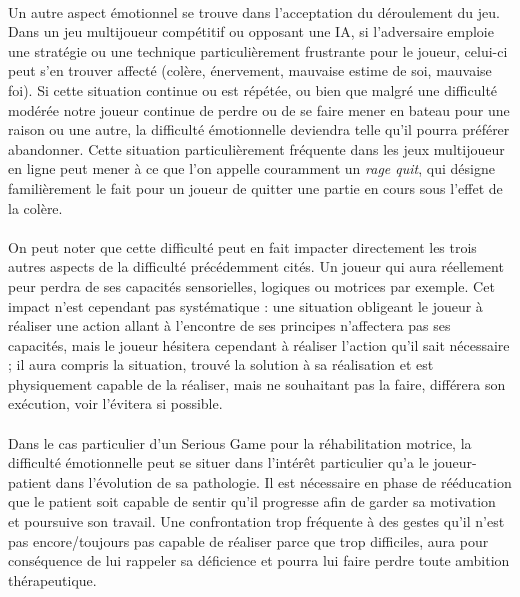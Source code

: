 \paragraph{}
Un autre aspect émotionnel se trouve dans l’acceptation du déroulement du jeu. Dans un jeu multijoueur compétitif ou opposant une IA, si l’adversaire emploie une stratégie ou une technique particulièrement frustrante pour le joueur, celui-ci peut s’en trouver affecté (colère, énervement, mauvaise estime de soi, mauvaise foi). Si cette situation continue ou est répétée, ou bien que malgré une difficulté modérée notre joueur continue de perdre ou de se faire mener en bateau pour une raison ou une autre, la difficulté émotionnelle deviendra telle qu’il pourra préférer abandonner. Cette situation particulièrement fréquente dans les jeux multijoueur en ligne peut mener à ce que l’on appelle couramment un \emph{rage quit}, qui désigne familièrement le fait pour un joueur de quitter une partie en cours sous l'effet de la colère.

\paragraph{}On peut noter que cette difficulté peut en fait impacter directement les trois autres aspects de la difficulté précédemment cités. Un joueur qui aura réellement peur perdra de ses capacités sensorielles, logiques ou motrices par exemple. Cet impact n’est cependant pas systématique : une situation obligeant le joueur à réaliser une action allant à l’encontre de ses principes n’affectera pas ses capacités, mais le joueur hésitera cependant à réaliser l’action qu’il sait nécessaire ; il aura compris la situation, trouvé la solution à sa réalisation et est physiquement capable de la réaliser, mais ne souhaitant pas la faire, différera son exécution, voir l’évitera si possible.

\paragraph{}Dans le cas particulier d’un Serious Game pour la réhabilitation motrice, la difficulté émotionnelle peut se situer dans l’intérêt particulier qu’a le joueur-patient dans l’évolution de sa pathologie. Il est nécessaire en phase de rééducation que le patient soit capable de sentir qu’il progresse afin de garder sa motivation et poursuive son travail. Une confrontation trop fréquente à des gestes qu’il n’est pas encore/toujours pas capable de réaliser parce que trop difficiles, aura pour conséquence de lui rappeler sa déficience et pourra lui faire perdre toute ambition thérapeutique.

